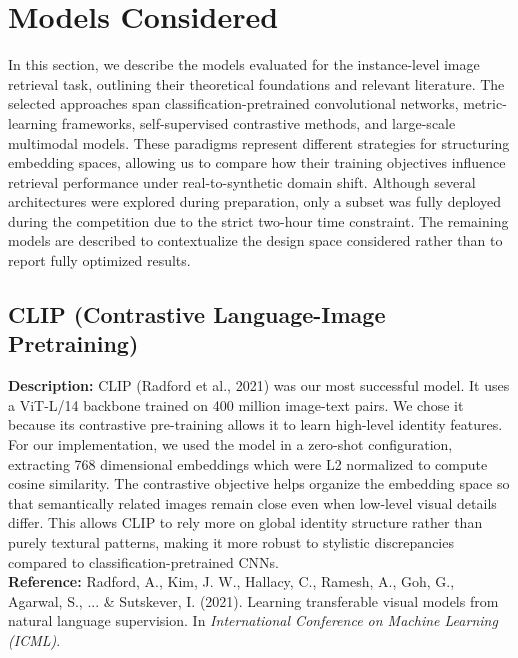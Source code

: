 \documentclass[10pt,twocolumn,letterpaper]{article}
\begin{document}
\section{Models Considered}
In this section, we describe the models evaluated for the instance-level image retrieval task, outlining their theoretical foundations and relevant literature. The selected approaches span classification-pretrained convolutional networks, metric-learning frameworks, self-supervised contrastive methods, and large-scale multimodal models. These paradigms represent different strategies for structuring embedding spaces, allowing us to compare how their training objectives influence retrieval performance under real-to-synthetic domain shift.
Although several architectures were explored during preparation, only a subset was fully deployed during the competition due to the strict two-hour time constraint. The remaining models are described to contextualize the design space considered rather than to report fully optimized results.

\subsection{CLIP (Contrastive Language-Image Pretraining)}
\textbf{Description:} CLIP (Radford et al., 2021) was our most successful model. It uses a ViT-L/14 backbone trained on 400 million image-text pairs. We chose it because its contrastive pre-training allows it to learn high-level identity features. For our implementation, we used the model in a zero-shot configuration, extracting 768 dimensional embeddings which were L2 normalized to compute cosine similarity. The contrastive objective helps organize the embedding space so that semantically related images remain close even when low-level visual details differ. This allows CLIP to rely more on global identity structure rather than purely textural patterns, making it more robust to stylistic discrepancies compared to classification-pretrained CNNs.\\

\textbf{Reference:} Radford, A., Kim, J. W., Hallacy, C., Ramesh, A., Goh, G., Agarwal, S., ... \& Sutskever, I. (2021). Learning transferable visual models from natural language supervision. In \textit{International Conference on Machine Learning (ICML)}.
\end{document}
